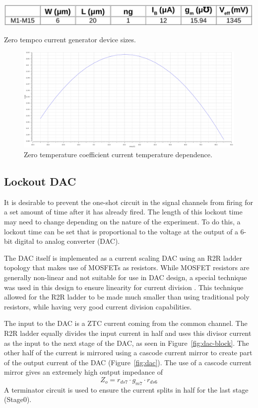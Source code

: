 \documentclass[12pt,oneside,final]{siuethesis}
\theoremstyle{definition}
\begin{document}
\begin{table}[htbp!]
 \centering
 \includegraphics[scale=.35,keepaspectratio=true]{./ch3_figures/ztc_sizes.png}
 \caption{Zero tempco current generator device sizes.}
 \label{tab:ztc-sizes}
\end{table}

\begin{figure}[htbp!]
\centering
\includegraphics[scale=.3,keepaspectratio=true]{../data/ztc.png} 
\caption{Zero temperature coefficient current temperature dependence.}
\label{fig:ztc-temp}
\end{figure}

\subsection{Lockout DAC}
\par It is desirable to prevent the one-shot circuit in the signal channels from firing for a set amount of time after it has already fired. The length of this lockout time may need to change depending on the nature of the experiment. To do this, a lockout time can be set that is proportional to the voltage at the output of a 6-bit digital to analog converter (DAC). 
\par The DAC itself is implemented as a current scaling DAC using an R2R ladder topology \cite{BAKER} that makes use of MOSFETs as resistors. While MOSFET resistors are generally non-linear and not suitable for use in DAC design, a special technique was used in this design to ensure linearity for current division \cite{DAC}. This technique allowed for the R2R ladder to be made much smaller than using traditional poly resistors, while having very good current division capabilities.
\par The input to the DAC is a ZTC current coming from the common channel. The R2R ladder equally divides the input current in half and uses this divisor current as the input to the next stage of the DAC, as seen in Figure~\ref{fig:dac-block}. The other half of the current is mirrored using a cascode current mirror to create part of the output current of the DAC (Figure~\ref{fig:dac}). The use of a cascode current mirror gives an extremely high output impedance of 
\begin{equation}
Z_{o} = r_{ds7}\cdot g_{m7} \cdot r_{ds6}
\end{equation} 
A terminator circuit is used to ensure the current splits in half for the last stage (Stage0).
\end{document}
